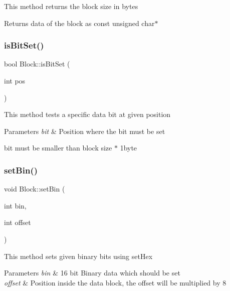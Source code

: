 This method returns the block size in bytes

\begin{DoxyReturn}{Returns}
data of the block as const unsigned char$\ast$ 
\end{DoxyReturn}
\mbox{\label{classcore_1_1logic_1_1_block_a0130b21b567a1149edcc02c48ccc52ef}} 
\subsubsection{\texorpdfstring{is\+Bit\+Set()}{isBitSet()}}
{\footnotesize\ttfamily bool Block\+::is\+Bit\+Set (\begin{DoxyParamCaption}\item[{int}]{pos }\end{DoxyParamCaption})}

This method tests a specific data bit at given position


\begin{DoxyParams}{Parameters}
{\em bit} & Position where the bit must be set\\
\hline
\end{DoxyParams}
bit must be smaller than block size $\ast$ 1byte \mbox{\label{classcore_1_1logic_1_1_block_a9f25c077733b21120df01e5174a8dfc7}} 
\subsubsection{\texorpdfstring{set\+Bin()}{setBin()}}
{\footnotesize\ttfamily void Block\+::set\+Bin (\begin{DoxyParamCaption}\item[{int}]{bin,  }\item[{int}]{offset }\end{DoxyParamCaption})}

This method sets given binary bits using set\+Hex


\begin{DoxyParams}{Parameters}
{\em bin} & 16 bit Binary data which should be set\\
\hline
{\em offset} & Position inside the data block, the offset will be multiplied by 8 \\
\hline
\end{DoxyParams}
\mbox{\label{classcore_1_1logic_1_1_block_acb19637acf2ec89d7d9fde9b40b3cd29}} 
